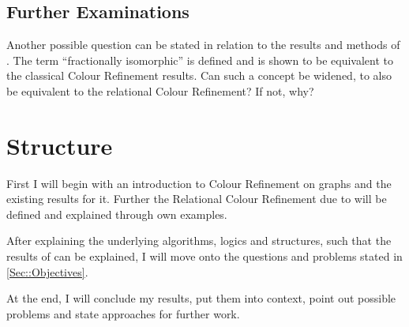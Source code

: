 \documentclass[a4paper,11pt,DIV=15]{scrartcl} %
\theoremstyle{plain}
\theoremstyle{definition}
\begin{document}
\subsection{Further Examinations}

Another possible question can be stated in relation to the results and methods of \cite{dell2018LovaszMeets}.
The term ``fractionally isomorphic'' is defined and is shown to be equivalent to the classical Colour Refinement results.
Can such a concept be widened, to also be equivalent to the relational Colour Refinement?
If not, why?
\fi

\section{Structure}

First I will begin with an introduction to Colour Refinement on graphs and the existing results for it. Further the Relational Colour Refinement due to \cite{scheidt2024color} will be defined and explained through own examples.

After explaining the underlying algorithms, logics and structures, such that the results of \cite{scheidt2024color} can be explained, I will move onto the questions and problems stated in \cref{Sec::Objectives}.

At the end, I will conclude my results, put them into context, point out possible problems and state approaches for further work.


\iffalse
\section{Related Works}

Colour refinement is a well-known algorithm that allows for isomorphism testing and performance optimizations in various fields, such as linear programming or machine learning \cite{grohe2021color}.
There have been multiple considerations of the homomorphism indistinguishability defined by Colour Refinement (e.g. \cite{fluck2023going}, \cite{manvcinska2020quantum}).
Furthermore, the $k$-dimensional Weisfeiler-Leman Algorithm extends the simple procedure and allows for stricter relationships between graphs \cite{kiefer2020power}.
However, the established results are constrained to (subclasses of) graphs (or Colored multigraphs, cf. \cite{dell2018LovaszMeets}).
An extension has been achieved by Schweickardt and Scheidt, by showing an analogous result for hypergraphs (graphs that admit edges between any number of vertices) in \cite{scheidt2023counting} and has further been generalized to structures of arbitrary relational signatures \cite{scheidt2024color}.
As Colour Refinement on graphs has shown itself to be very applicable in a lot of situations, a similar usefulness for Relational Colour Refinement seems probable.
\fi




\end{document}
